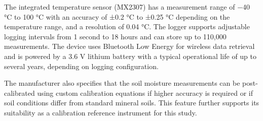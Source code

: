 The integrated temperature sensor (MX2307) has a measurement range of
−40 °C to 100 °C with an accuracy of ±0.2 °C to ±0.25 °C depending on
the temperature range, and a resolution of 0.04 °C. The logger supports
adjustable logging intervals from 1 second to 18 hours and can store up
to 110,000 measurements. The device uses Bluetooth Low Energy for
wireless data retrieval and is powered by a 3.6 V lithium battery with a
typical operational life of up to several years, depending on logging
configuration.

The manufacturer also specifies that the soil moisture measurements can
be post-calibrated using custom calibration equations if higher accuracy
is required or if soil conditions differ from standard mineral soils.
This feature further supports its suitability as a calibration reference
instrument for this study.
